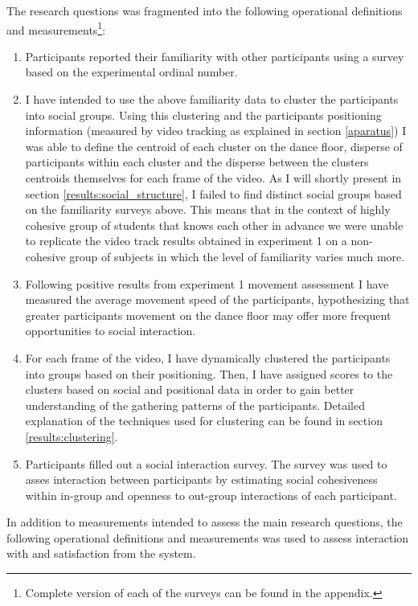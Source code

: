 \documentclass[a4paper,11pt]{article}
\begin{document}
{The research questions was fragmented into the following operational definitions and measurements\footnote{Complete version of each of the surveys can be found in the appendix.}:
\begin{enumerate}
	\item \label{measure:survey:familiarity} Participants reported their familiarity with other participants using a survey based on the experimental ordinal number.
	\item I have intended to use the above familiarity data to cluster the participants into social groups.
            Using this clustering and the participants positioning information (measured by video tracking as explained in section \ref{aparatus}) I was able to define the centroid of each cluster on the dance floor, disperse of participants within each cluster and the disperse between the clusters centroids themselves for each frame of the video.
            As I will shortly present in section \ref{results:social_structure}, I failed to find distinct social groups based on the familiarity surveys above.
            This means that in the context of highly cohesive group of students that knows each other in advance we were unable to replicate the video track results obtained in experiment 1 on a non-cohesive group of subjects in which the level of familiarity varies much more.
        \item \label{measure:movement} Following positive results from experiment 1 movement assessment I have measured the average movement speed of the participants, hypothesizing that greater participants movement on the dance floor may offer more frequent opportunities to social interaction.
        \item \label{measure:clustering} For each frame of the video, I have dynamically clustered the participants into groups based on their positioning.
            Then, I have assigned scores to the clusters based on social and positional data in order to gain better understanding of the gathering patterns of the participants.
            Detailed explanation of the techniques used for clustering can be found in section \ref{results:clustering}.
	\item \label{measure:survey:social} Participants filled out a social interaction survey.
	The survey was used to asses interaction between participants by estimating social cohesiveness within in-group and openness to out-group interactions of each participant.
\end{enumerate}
In addition to measurements intended to assess the main research questions, the following operational definitions and measurements was used to assess interaction with and satisfaction from the system.
}
\end{document}
